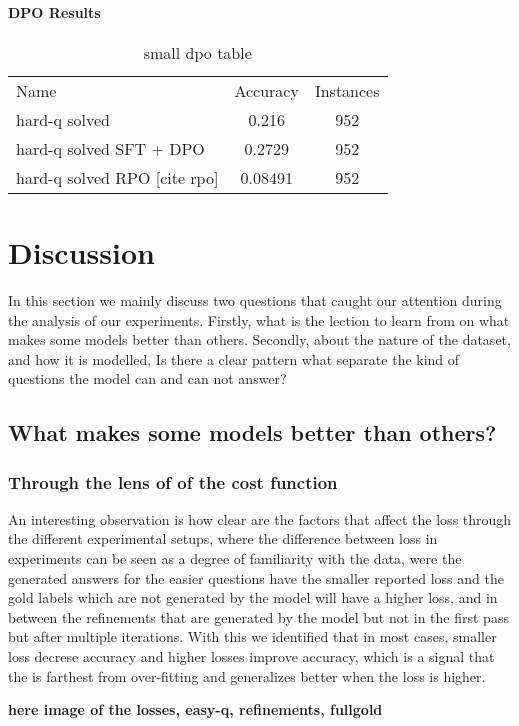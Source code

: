 \documentclass[a4paper,10pt]{article}
\begin{document}
\paragraph{DPO Results}

\begin{table}[ht]
\centering
 \begin{tabular}{lcc}
 Name & Accuracy & Instances \\
 hard-q solved & 0.216 & 952 \\
 hard-q solved SFT + DPO & 0.2729 & 952 \\
 hard-q solved RPO [cite rpo] & 0.08491 & 952 \\
 \end{tabular}
 \caption{small dpo table}
\end{table}


\section{Discussion}
In this section we mainly discuss two questions that caught our attention during the analysis of our experiments. Firstly, what is the lection to learn from on what makes some models better than others. Secondly, about the nature of the dataset, and how it is modelled, Is there a clear pattern what separate the kind of questions the model can and can not answer?
\subsection{What makes some models better than others?}
\subsubsection{Through the lens of of the cost function}
An interesting observation is how clear are the factors that affect the loss through the different experimental setups, where the difference between loss in experiments can be seen as a degree of familiarity with the data, were the generated answers for the easier questions have the smaller reported loss and the gold labels which are not generated by the model will have a higher loss, and in between the refinements that are generated by the model but not in the first pass but after multiple iterations. With this we identified that in most cases, smaller loss decrese accuracy and higher losses improve accuracy, which is a signal that the is farthest from over-fitting and generalizes better when the loss is higher.

\textbf{here image of the losses, easy-q, refinements, fullgold}
\end{document}
